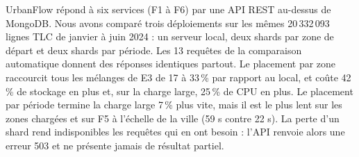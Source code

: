 UrbanFlow répond à six services (F1 à F6) par une API REST au-dessus de MongoDB.
Nous avons comparé trois déploiements sur les mêmes 20\,332\,093 lignes TLC de janvier
à juin 2024 : un serveur local, deux shards par zone de départ et deux shards par
période. Les 13 requêtes de la comparaison automatique donnent des réponses identiques
partout. Le placement par zone raccourcit tous les mélanges de E3 de 17 à 33\,\% par
rapport au local, et coûte 42\,\% de stockage en plus et, sur la charge large, 25\,\%
de CPU en plus. Le placement par période termine la charge large 7\,\% plus vite, mais
il est le plus lent sur les zones chargées et sur F5 à l'échelle de la ville (59 s contre
22 s). La perte d'un shard rend indisponibles les requêtes qui en ont besoin : l'API
renvoie alors une erreur 503 et ne présente jamais de résultat partiel.
